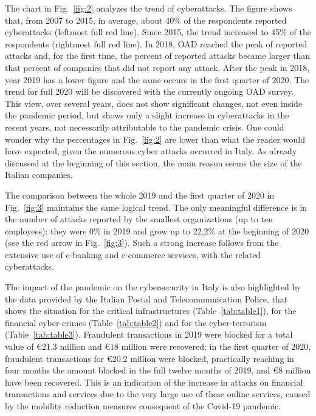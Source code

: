\documentclass{easychair}
\begin{document}
The chart in Fig.~\ref{fig:2} analyzes the trend of cyberattacks.
The figure shows that, from 2007 to 2015, in average, about 40\% of the respondents
reported cyberattacks (leftmost full red line). Since 2015, the trend increased to 45\%
of the respondents (rightmost full red line). 
In 2018, OAD reached the peak of reported attacks and, for the first time, the percent of
reported attacks became larger than that percent of companies that did not report any attack.
After the peak 
in 2018, year 2019 has a lower figure and the same occurs in the first quarter of 2020.
The trend for full 2020 will be discovered with the currently ongoing OAD survey.
This view, over several years, does not show significant changes, not even inside
the pandemic period, but shows only a slight increase in cyberattacks 
in the recent years, not necessarily attributable to the pandemic crisis. One could wonder
why the percentages in Fig.~\ref{fig:2} are lower than what the reader would have expected, 
given the numerous cyber attacks occurred in Italy. As already discussed at the beginning of 
this section, the main reason seems the size of the Italian companies.

The comparison between the whole 2019 and the first quarter of 2020
in Fig.~\ref{fig:3} maintains the same logical trend. The only meaningful difference
is in the number of attacks reported by the smallest
organizations (up to ten employees): they were 0\% in 2019 and grow up to
22,2\% at the beginning of 2020 (see the red arrow in Fig.~\ref{fig:3}).
Such a strong increase follows from the extensive use of e-banking and 
e-commerce services, with the related cyberattacks.

The impact of the pandemic on the cybersecurity in Italy is also highlighted by the data
provided by the Italian Postal and Telecommunication Police, that shows the situation for the
critical infrastructures (Table~\ref{tab:table1}), for the financial cyber-crimes
(Table~\ref{tab:table2}) and for the cyber-terrorism (Table~\ref{tab:table3}). 
Fraudulent transactions in 2019 were blocked for a total value of \euro 21.3 million and \euro 18 million were recovered; in the first quarter of 
2020, fraudulent transactions for \euro 20.2 million were blocked,
practically reaching in four months the amount
blocked in the full twelve months of 2019, and \euro 8 million have been
recovered. This is an indication of the increase in attacks on financial transactions
and services due to the very large use of these online services, caused by the mobility reduction
measures consequent of the Covid-19 pandemic.
\end{document}
